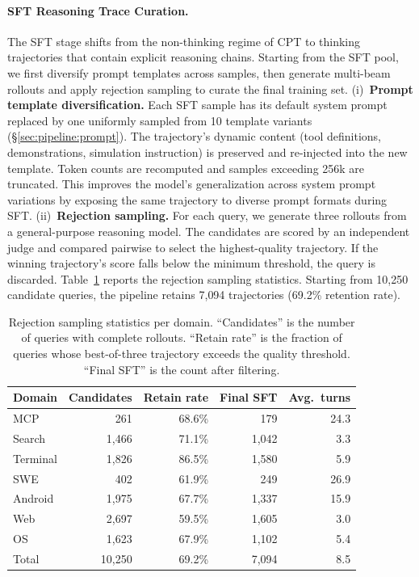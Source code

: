 \documentclass{llmxive}
\begin{document}
\paragraph{SFT Reasoning Trace Curation.}
The SFT stage shifts from the non-thinking regime of CPT to thinking trajectories that contain explicit reasoning chains.
Starting from the SFT pool, we first diversify prompt templates across samples, then generate multi-beam rollouts and apply rejection sampling to curate the final training set.
(i)~\textbf{Prompt template diversification.}
Each SFT sample has its default system prompt replaced by one uniformly sampled from 10 template variants (\S\ref{sec:pipeline:prompt}).
The trajectory's dynamic content (tool definitions, demonstrations, simulation instruction) is preserved and re-injected into the new template.
Token counts are recomputed and samples exceeding 256k are truncated.
This improves the model's generalization across system prompt variations by exposing the same trajectory to diverse prompt formats during SFT.
(ii)~\textbf{Rejection sampling.}
For each query, we generate three rollouts from a general-purpose reasoning model.
The candidates are scored by an independent judge and compared pairwise to select the highest-quality trajectory.
If the winning trajectory's score falls below the minimum threshold, the query is discarded.
Table~\ref{tab:rejection_sampling} reports the rejection sampling statistics.
Starting from 10{,}250 candidate queries, the pipeline retains 7{,}094 trajectories (69.2\% retention rate).

\begin{table}[!ht]
\centering
\small
\begin{tabular}{@{}lrrrr@{}}
\toprule
\textbf{Domain} & \textbf{Candidates} & \textbf{Retain rate} & \textbf{Final SFT} & \textbf{Avg.\ turns} \\
\midrule
MCP      & 261    & 68.6\% & 179     & 24.3 \\
Search   & 1{,}466 & 71.1\% & 1{,}042 & 3.3 \\
Terminal & 1{,}826 & 86.5\% & 1{,}580 & 5.9 \\
SWE      & 402    & 61.9\% & 249     & 26.9 \\
Android  & 1{,}975 & 67.7\% & 1{,}337 & 15.9 \\
Web      & 2{,}697 & 59.5\% & 1{,}605 & 3.0 \\
OS       & 1{,}623 & 67.9\% & 1{,}102 & 5.4 \\
\midrule
Total & 10{,}250 & 69.2\% & 7{,}094 & 8.5 \\
\bottomrule
\end{tabular}
\caption{Rejection sampling statistics per domain. ``Candidates'' is the number of queries with complete rollouts. ``Retain rate'' is the fraction of queries whose best-of-three trajectory exceeds the quality threshold. ``Final SFT'' is the count after filtering.}
\label{tab:rejection_sampling}
\end{table}
\end{document}
